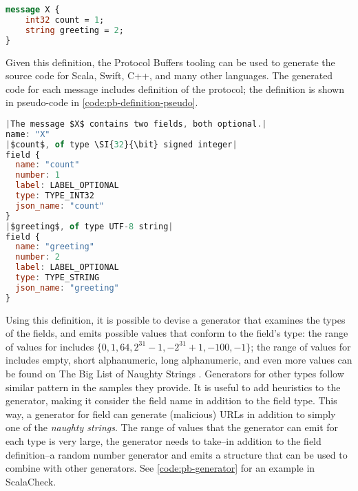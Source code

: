 \begin{lstlisting}[caption={Trivial protocol definition}, label={code:pb-example}, language=Protobuf]
message X {
    int32 count = 1;
    string greeting = 2; 
}
\end{lstlisting}

Given this definition, the Protocol Buffers tooling can be used to generate the source code for Scala, Swift, C++, and many other languages. The generated code for each message includes definition of the protocol; the definition is shown in pseudo-code in \autoref{code:pb-definition-pseudo}.

\begin{lstlisting}[caption={Trivial protocol definition}, label={code:pb-definition-pseudo}, language=JavaScript, escapechar=|]
|The message $X$ contains two fields, both optional.|
name: "X"
|$count$, of type \SI{32}{\bit} signed integer|
field {
  name: "count"
  number: 1
  label: LABEL_OPTIONAL
  type: TYPE_INT32
  json_name: "count"
}
|$greeting$, of type UTF-8 string|
field {
  name: "greeting"
  number: 2
  label: LABEL_OPTIONAL
  type: TYPE_STRING
  json_name: "greeting"
}
\end{lstlisting}

Using this definition, it is possible to devise a generator that examines the types of the fields, and emits possible values that conform to the field's type: the range of values for  includes $\{0, 1, 64, 2^{31}-1, -2^{31}+1, -100, -1\}$; the range of values for  includes empty, short alphanumeric, long alphanumeric, and even more values can be found on The Big List of Naughty Strings \cite{blns}. Generators for other types follow similar pattern in the samples they provide. It is useful to add heuristics to the generator, making it consider the field name in addition to the field type. This way, a generator for field  can generate (malicious) URLs in addition to simply one of the \emph{naughty strings}. The range of values that the generator can emit for each type is very large, the generator needs to take--in addition to the field definition--a random number generator and emits a structure that can be used to combine with other generators. See \autoref{code:pb-generator} for an example in ScalaCheck.

